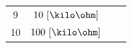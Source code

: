 \begin{enumerate}
\begin{center}
\begin{tabular}{c|c|c|c}
      9 & $10~[\kilo\ohm]$ & \underline{\hspace{2.0 cm}} & \underline{\hspace{2.0 cm}}\\
      10 & $100~[\kilo\ohm]$ & \underline{\hspace{2.0 cm}} & \underline{\hspace{2.0 cm}}\\
      \bottomrule
    \end{tabular}    
  \end{center}

\end{enumerate}

